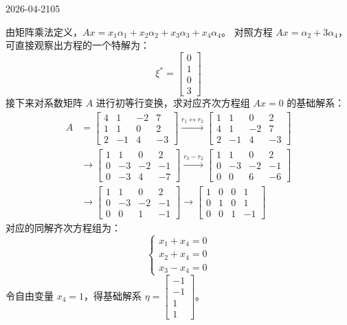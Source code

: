 \begin{mistake}{2026-04-21}{05}
\begin{solutioncontent}
由矩阵乘法定义，\(Ax = x_1\alpha_1 + x_2\alpha_2 + x_3\alpha_3 + x_4\alpha_4\)。
对照方程 \(Ax = \alpha_2 + 3\alpha_4\)，可直接观察出方程的一个特解为：
\[
\xi^* = \begin{bmatrix} 0 \\ 1 \\ 0 \\ 3 \end{bmatrix}
\]
接下来对系数矩阵 \(A\) 进行初等行变换，求对应齐次方程组 \(Ax=0\) 的基础解系：
\[
\begin{aligned}
A &= \begin{bmatrix} 4 & 1 & -2 & 7 \\ 1 & 1 & 0 & 2 \\ 2 & -1 & 4 & -3 \end{bmatrix} \xrightarrow{r_1 \leftrightarrow r_2} \begin{bmatrix} 1 & 1 & 0 & 2 \\ 4 & 1 & -2 & 7 \\ 2 & -1 & 4 & -3 \end{bmatrix} \\
&\to \begin{bmatrix} 1 & 1 & 0 & 2 \\ 0 & -3 & -2 & -1 \\ 0 & -3 & 4 & -7 \end{bmatrix} \xrightarrow{r_3 - r_2} \begin{bmatrix} 1 & 1 & 0 & 2 \\ 0 & -3 & -2 & -1 \\ 0 & 0 & 6 & -6 \end{bmatrix} \\
&\to \begin{bmatrix} 1 & 1 & 0 & 2 \\ 0 & -3 & -2 & -1 \\ 0 & 0 & 1 & -1 \end{bmatrix} \to \begin{bmatrix} 1 & 0 & 0 & 1 \\ 0 & 1 & 0 & 1 \\ 0 & 0 & 1 & -1 \end{bmatrix}
\end{aligned}
\]
对应的同解齐次方程组为：
\[
\begin{cases} x_1 + x_4 = 0 \\ x_2 + x_4 = 0 \\ x_3 - x_4 = 0 \end{cases}
\]
令自由变量 \(x_4 = 1\)，得基础解系 \(\eta = \begin{bmatrix} -1 \\ -1 \\ 1 \\ 1 \end{bmatrix}\)。

\end{solutioncontent}
\end{mistake}
